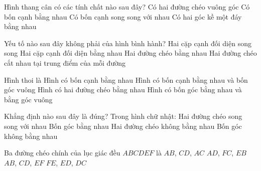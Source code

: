 \begin{ex}%
\end{ex}

\begin{ex}%
	Hình thang cân có các tính chất nào sau đây? 
	\choice
	{Có hai đường chéo vuông góc}
	{Có bốn cạnh bằng nhau}	
	{Có bốn cạnh song song với nhau}
	{\True Có hai góc kề một đáy bằng nhau}
\end{ex}

\begin{ex} 
	Yếu tố nào sau đây không phải của hình bình hành?
	\choice
	{ Hai cặp cạnh đối diện song song}
	{Hai cặp cạnh đối diện bằng nhau}
	{\True Hai đường chéo bằng nhau}
	{Hai đường chéo cắt nhau tại trung điểm của mỗi đường}
\end{ex}     

\begin{ex}
	Hình thoi là
	\choice
	{\True Hình có bốn cạnh bằng nhau}
	{Hình có bốn cạnh bằng nhau và bốn góc vuông}
	{Hình có hai đường chéo bằng nhau}
	{Hình có bốn góc bằng nhau và bằng góc vuông}
\end{ex}

\begin{ex}
	Khẳng định nào sau đây là đúng? Trong hình chữ nhật:
	\choice
	{Hai đường chéo song song với nhau}
	{\True Bốn góc bằng nhau}
	{Hai đường chéo không bằng nhau}
	{Bốn góc không bằng nhau}
\end{ex}

\begin{ex} 
	Ba đường chéo chính của lục giác đều $A B C D E F$ là
	\choice
	{$A B$, $C D$, $A C$}
	{\True $A D$, $F C$, $E B$}
	{$AB$, $CD$, $EF$}
	{$F E$, $E D$, $D C$}	
\end{ex}


